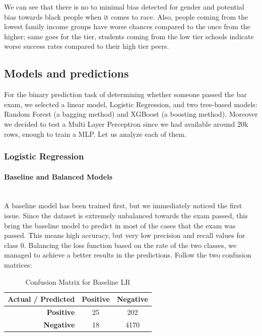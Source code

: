 \documentclass{article}
\begin{document}
We can see that there is no to minimal bias detected for gender and potential bias towards black people when it comes to race. Also, people coming from the lowest family income groups have worse chances compared to the once from the higher; same goes for the tier, students coming from the low tier schools indicate worse success rates compared to their high tier peers.
\subsection{Models and predictions}
For the binary prediction task of determining whether someone passed the bar exam, we selected a linear model, Logistic Regression, and two tree-based models: Random Forest (a bagging method) and XGBoost (a boosting method). Moreover we decided to test a Multi Layer Perceptron since we had available around 20k rows, enough to train a MLP. Let us analyze each of them.
\subsubsection{Logistic Regression}
\paragraph{Baseline and Balanced Models}\mbox{}\\
A baseline model has been trained first, but we immediately noticed the first issue. Since the dataset is extremely unbalanced towards the exam passed, this bring the baseline model to predict in most of the cases that the exam was passed. This means high accuracy, but very low precision and recall values for class 0. Balancing the loss function based on the rate of the two classes, we managed to achieve a better results in the predictions. Follow the two confusion matrices:
\begin{table}[h!]
\centering
\caption{Confusion Matrix for Baseline LR}
\label{tab:confusion_matrix}
\begin{tabular}{r|cc}
\toprule
\textbf{Actual / Predicted} & \textbf{Positive} & \textbf{Negative} \\
\midrule
\textbf{Positive} & 25 & 202 \\
\textbf{Negative} & 18 & 4170\\
\bottomrule
\end{tabular}
\end{table}
\end{document}
